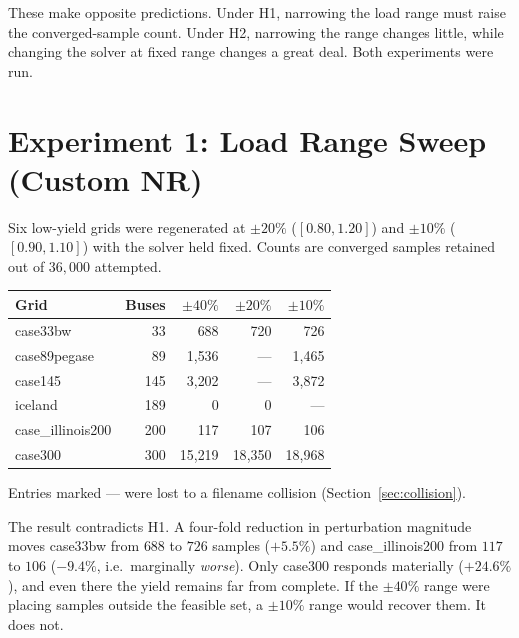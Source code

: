 \documentclass{article}
\newcommand{\cwarn}[1]{\textcolor{warn}{#1}}
\newcommand{\cbad}[1]{\textcolor{bad}{#1}}
\begin{document}
These make opposite predictions.  Under H1, narrowing the load range must
raise the converged-sample count.  Under H2, narrowing the range changes
little, while changing the solver at fixed range changes a great deal.
Both experiments were run.


\section{Experiment 1: Load Range Sweep (Custom NR)}

Six low-yield grids were regenerated at $\pm20\%$ ($[0.80,1.20]$) and
$\pm10\%$ ($[0.90,1.10]$) with the solver held fixed.  Counts are converged
samples retained out of $36{,}000$ attempted.

\begin{center}
\begin{tabular}{l r r r r}
\toprule
\textbf{Grid} & \textbf{Buses} & \textbf{$\pm40\%$} & \textbf{$\pm20\%$} & \textbf{$\pm10\%$} \\
\midrule
case33bw          & 33  & \cbad{688}    & \cbad{720}    & \cbad{726} \\
case89pegase      & 89  & \cbad{1{,}536}& ---         & \cbad{1{,}465} \\
case145           & 145 & \cbad{3{,}202}& ---         & \cbad{3{,}872} \\
iceland           & 189 & \cbad{0}      & \cbad{0}      & --- \\
case\_illinois200 & 200 & \cbad{117}    & \cbad{107}    & \cbad{106} \\
case300           & 300 & \cwarn{15{,}219}& \cwarn{18{,}350}& \cwarn{18{,}968} \\
\bottomrule
\end{tabular}
\end{center}

\noindent
Entries marked --- were lost to a filename collision (Section~\ref{sec:collision}).

The result contradicts H1.  A four-fold reduction in perturbation magnitude
moves case33bw from $688$ to $726$ samples ($+5.5\%$) and case\_illinois200
from $117$ to $106$ ($-9.4\%$, i.e.\ marginally \emph{worse}).  Only case300
responds materially ($+24.6\%$), and even there the yield remains far from
complete.  If the $\pm40\%$ range were placing samples outside the feasible
set, a $\pm10\%$ range would recover them.  It does not.
\end{document}
